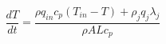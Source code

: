 \documentclass[preview]{standalone}
\begin{document}
\begin{align*}
\dfrac{dT}{dt} = \dfrac{ \rho q_{in} c_p (T_{in}-T) + \rho_j q_j \lambda_j }{\rho A L c_p}
\end{align*}
\end{document}
